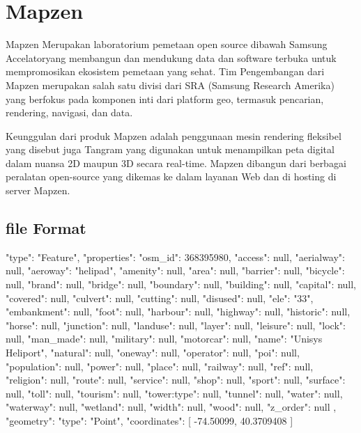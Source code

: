 \section{Mapzen}
Mapzen Merupakan laboratorium pemetaan open source dibawah Samsung Accelatoryang membangun dan mendukung data dan software terbuka untuk mempromosikan ekosistem pemetaan yang sehat. Tim Pengembangan dari Mapzen merupakan salah satu divisi dari SRA (Samsung Research Amerika) yang berfokus pada komponen inti dari platform geo, termasuk pencarian, rendering, navigasi, dan data.

Keunggulan dari produk Mapzen adalah penggunaan mesin rendering fleksibel yang disebut juga Tangram yang digunakan untuk menampilkan peta digital dalam nuansa 2D maupun 3D secara real-time. Mapzen dibangun dari berbagai peralatan open-source yang dikemas ke dalam layanan Web dan di hosting di server Mapzen.

\subsection{file Format}
{
"type": "Feature",
"properties": {
    "osm_id": 368395980,
    "access": null,
    "aerialway": null,
    "aeroway": "helipad",
    "amenity": null,
    "area": null,
    "barrier": null,
    "bicycle": null,
    "brand": null,
    "bridge": null,
    "boundary": null,
    "building": null,
    "capital": null,
    "covered": null,
    "culvert": null,
    "cutting": null,
    "disused": null,
    "ele": "33",
    "embankment": null,
    "foot": null,
    "harbour": null,
    "highway": null,
    "historic": null,
    "horse": null,
    "junction": null,
    "landuse": null,
    "layer": null,
    "leisure": null,
    "lock": null,
    "man_made": null,
    "military": null,
    "motorcar": null,
    "name": "Unisys Heliport",
    "natural": null,
    "oneway": null,
    "operator": null,
    "poi": null,
    "population": null,
    "power": null,
    "place": null,
    "railway": null,
    "ref": null,
    "religion": null,
    "route": null,
    "service": null,
    "shop": null,
    "sport": null,
    "surface": null,
    "toll": null,
    "tourism": null,
    "tower:type": null,
    "tunnel": null,
    "water": null,
    "waterway": null,
    "wetland": null,
    "width": null,
    "wood": null,
    "z_order": null
},
"geometry": {
    "type": "Point",
    "coordinates": [
        -74.50099,
        40.3709408
    ]
}
}
